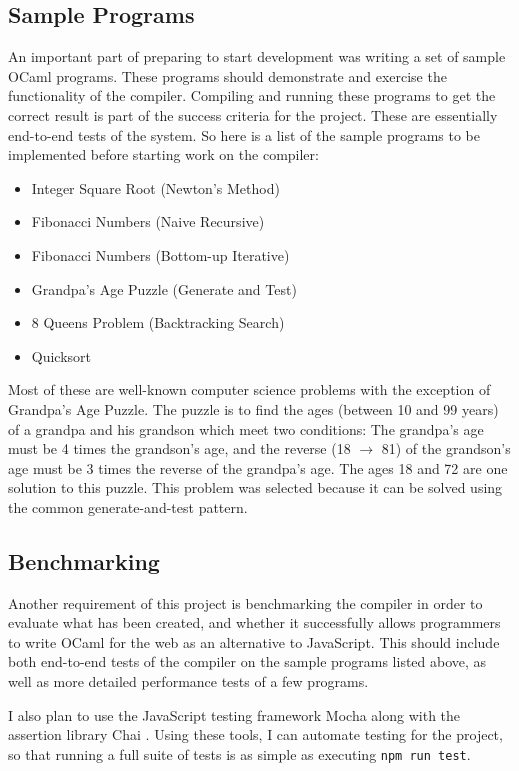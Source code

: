\documentclass[12pt,a4paper,twoside,openright]{report}
\begin{document}
\subsection{Sample Programs}
An important part of preparing to start development was writing a set of sample OCaml programs.
These programs should demonstrate and exercise the functionality of the compiler.
Compiling and running these programs to get the correct result is part of the success criteria for the project.
These are essentially end-to-end tests of the system.
So here is a list of the sample programs to be implemented before starting work on the compiler:
\begin{itemize}
   \item Integer Square Root (Newton's Method)
   \item Fibonacci Numbers (Naive Recursive)
   \item Fibonacci Numbers (Bottom-up Iterative)
   \item Grandpa's Age Puzzle (Generate and Test)
   \item 8 Queens Problem (Backtracking Search)
   \item Quicksort
\end{itemize}
Most of these are well-known computer science problems with the exception of Grandpa's Age Puzzle.
The puzzle is to find the ages (between 10 and 99 years) of a grandpa and his grandson which meet two conditions: The grandpa's age must be 4 times the grandson's age, and the reverse (18 $\rightarrow$ 81) of the grandson's age must be 3 times the reverse of the grandpa's age.
The ages 18 and 72 are one solution to this puzzle.
This problem was selected because it can be solved using the common generate-and-test pattern.

\subsection{Benchmarking}
Another requirement of this project is benchmarking the compiler in order to evaluate what has been created, and whether it successfully allows programmers to write OCaml for the web as an alternative to JavaScript.
This should include both end-to-end tests of the compiler on the sample programs listed above, as well as more detailed performance tests of a few programs.

I also plan to use the JavaScript testing framework Mocha along with the assertion library Chai \cite{mochaorg}.
Using these tools, I can automate testing for the project, so that running a full suite of tests is as simple as executing {\tt npm run test}.
\end{document}
